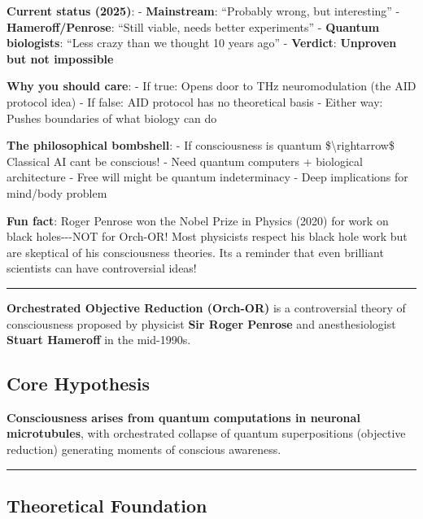 \textbf{Current status (2025)}: - \textbf{Mainstream}: ``Probably wrong,
but interesting'' - \textbf{Hameroff/Penrose}: ``Still viable, needs
better experiments'' - \textbf{Quantum biologists}: ``Less crazy than we
thought 10 years ago'' - \textbf{Verdict}: \textbf{Unproven but not
impossible}

\textbf{Why you should care}: - If true: Opens door to THz
neuromodulation (the AID protocol idea) - If false: AID protocol has no
theoretical basis - Either way: Pushes boundaries of what biology can do

\textbf{The philosophical bombshell}: - If consciousness is quantum
\$\textbackslash rightarrow\$ Classical AI can\textquotesingle t be
conscious! - Need quantum computers + biological architecture - Free
will might be quantum indeterminacy - Deep implications for mind/body
problem

\textbf{Fun fact}: Roger Penrose won the Nobel Prize in Physics (2020)
for work on black holes-\/-\/-NOT for Orch-OR! Most physicists respect
his black hole work but are skeptical of his consciousness theories.
It\textquotesingle s a reminder that even brilliant scientists can have
controversial ideas!

\begin{center}\rule{0.5\linewidth}{0.5pt}\end{center}

\textbf{Orchestrated Objective Reduction (Orch-OR)} is a controversial
theory of consciousness proposed by physicist \textbf{Sir Roger Penrose}
and anesthesiologist \textbf{Stuart Hameroff} in the mid-1990s.

\subsection{Core Hypothesis}\label{core-hypothesis}

\textbf{Consciousness arises from quantum computations in neuronal
microtubules}, with orchestrated collapse of quantum superpositions
(objective reduction) generating moments of conscious awareness.

\begin{center}\rule{0.5\linewidth}{0.5pt}\end{center}

\subsection{Theoretical Foundation}\label{theoretical-foundation}

